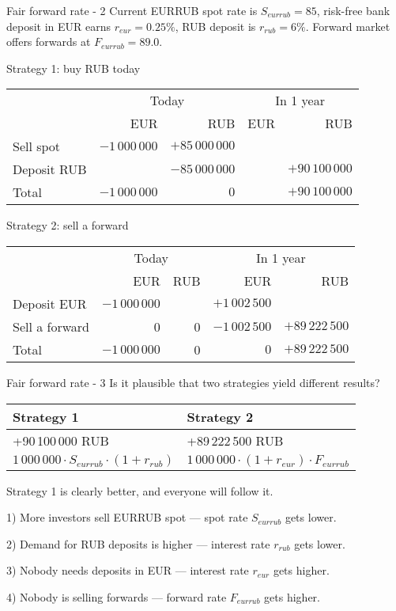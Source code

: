 \documentclass{beamer}
\begin{document}
\begin{frame}{Fair forward rate - 2}
\justify
Current EURRUB spot rate is $S_{eurrub}=85$, risk-free bank deposit in EUR earns $r_{eur}=0.25\%$, RUB deposit is $r_{rub}=6\%$. 
Forward market offers forwards at $F_{eurrub}=89.0$.

\justify
Strategy 1: buy RUB today

\centering
\begin{tabular}{l|r|r|r|r}
& \multicolumn{2}{c|}{Today} & \multicolumn{2}{c}{In 1 year} \\ \cline{2-5}
& EUR & RUB & EUR & RUB \\ \hline
Sell spot & $-1\,000\,000$ & $+85\,000\,000$ & & \\
Deposit RUB & & $-85\,000\,000$ & & $+90\,100\,000$ \\ \hline
Total & $-1\,000\,000$ & $0$ & & $+90\,100\,000$
\end{tabular}

\justify
Strategy 2: sell a forward

\centering
\begin{tabular}{l|r|r|r|r}
& \multicolumn{2}{c|}{Today} & \multicolumn{2}{c}{In 1 year} \\ \cline{2-5}
& EUR & RUB & EUR & RUB \\ \hline
Deposit EUR & $-1\,000\,000$ & & $+1\,002\,500$ & \\
Sell a forward & 0 & 0 & $-1\,002\,500$ & $+89\,222\,500$ \\ \hline
Total & $-1\,000\,000$ & 0 & $0$ & $+89\,222\,500$
\end{tabular}

\end{frame}



\begin{frame}{Fair forward rate - 3}
\justify
Is it plausible that two strategies yield different results?

\justify
\centering
\begin{tabular}{l|l}
Strategy 1 & Strategy 2 \\ \hline
+90\,100\,000 RUB  & +89\,222\,500 RUB \\
$1\,000\,000 \cdot S_{eurrub} \cdot (1+r_{rub})$ & $1\,000\,000 \cdot (1+r_{eur}) \cdot F_{eurrub}$
\end{tabular}

\justify
Strategy 1 is clearly better, and everyone will follow it. 

1) More investors sell EURRUB spot --- spot rate $S_{eurrub}$ gets lower.

2) Demand for RUB deposits is higher --- interest rate $r_{rub}$ gets lower.

3) Nobody needs deposits in EUR --- interest rate $r_{eur}$ gets higher. 

4) Nobody is selling forwards --- forward rate $F_{eurrub}$ gets higher.
\end{frame}
\end{document}

